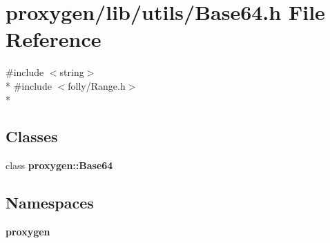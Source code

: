 \section{proxygen/lib/utils/\+Base64.h File Reference}
\label{Base64_8h}
{\ttfamily \#include $<$string$>$}\\*
{\ttfamily \#include $<$folly/\+Range.\+h$>$}\\*
\subsection*{Classes}
\begin{DoxyCompactItemize}
\item 
class {\bf proxygen\+::\+Base64}
\end{DoxyCompactItemize}
\subsection*{Namespaces}
\begin{DoxyCompactItemize}
\item 
 {\bf proxygen}
\end{DoxyCompactItemize}

